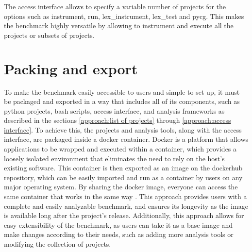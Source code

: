 The access interface allows to specify a variable number of projects for the options such as instrument, run, lex\_instrument, lex\_test and pycg. This makes the benchmark highly versatile by allowing to instrument and execute all the projects or subsets of projects.

\section{Packing and export}
\label{approach:packing and exporting}
To make the benchmark easily accessible to users and simple to set up, it must be packaged and exported in a way that includes all of its components, such as python projects, bash scripts, access interface, and analysis frameworks as described in the sections \ref{approach:list of projects} through \ref{approach:access interface}. To achieve this, the projects and analysis tools, along with the access interface, are packaged inside a docker container. Docker is a platform that allows applications to be wrapped and executed within a container, which provides a loosely isolated environment that eliminates the need to rely on the host's existing software. This container is then exported as an image on the dockerhub repository, which can be easily imported and run as a container by users on any major operating system. By sharing the docker image, everyone can access the same container that works in the same way \cite{Docker_2022}. This approach provides users with a complete and easily analyzable benchmark, and ensures its longevity as the image is available long after the project's release. Additionally, this approach allows for easy extensibility of the benchmark, as users can take it as a base image and make changes according to their needs, such as adding more analysis tools or modifying the collection of projects.

